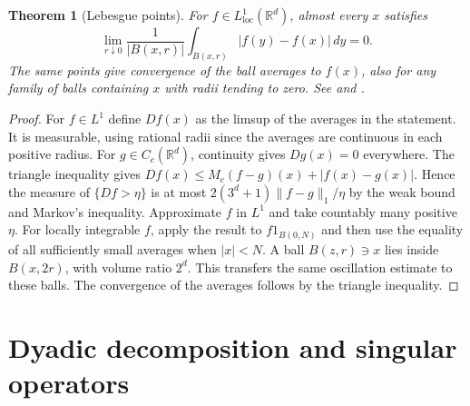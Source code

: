 \documentclass[11pt,oneside,openany]{book}
\newtheorem{theorem}{Theorem}[chapter]
\theoremstyle{definition}
\theoremstyle{remark}
\begin{document}
\begin{theorem}[Lebesgue points]
\label{p102:AN-06-C03-R03}
For \(f\in L^1_{\mathrm{loc}}(\mathbb R^d)\), almost every \(x\) satisfies
\[
 \lim_{r\downarrow0}\frac1{|B(x,r)|}\int_{B(x,r)}|f(y)-f(x)|\,dy=0.
\]
The same points give convergence of the ball averages to \(f(x)\), also for any family of balls containing \(x\) with radii tending to zero. See \cite[\S2.1.3]{grafakos} and \cite[\S3.4]{folland}.
\end{theorem}
\begin{proof}
For \(f\in L^1\) define \(Df(x)\) as the limsup of the averages in the statement. It is measurable, using rational radii since the averages are continuous in each positive radius. For \(g\in C_c(\mathbb R^d)\), continuity gives \(Dg(x)=0\) everywhere. The triangle inequality gives
\(Df(x)\le M_c(f-g)(x)+|f(x)-g(x)|\). Hence the measure of \(\{Df>\eta\}\) is at most \(2(3^d+1)\|f-g\|_1/\eta\) by the weak bound and Markov's inequality. Approximate \(f\) in \(L^1\) and take countably many positive \(\eta\). For locally integrable \(f\), apply the result to \(f1_{B(0,N)}\) and then use the equality of all sufficiently small averages when \(|x|<N\). A ball \(B(z,r)\ni x\) lies inside \(B(x,2r)\), with volume ratio \(2^d\). This transfers the same oscillation estimate to these balls. The convergence of the averages follows by the triangle inequality.
\end{proof}

\section{Dyadic decomposition and singular operators}
\end{document}
